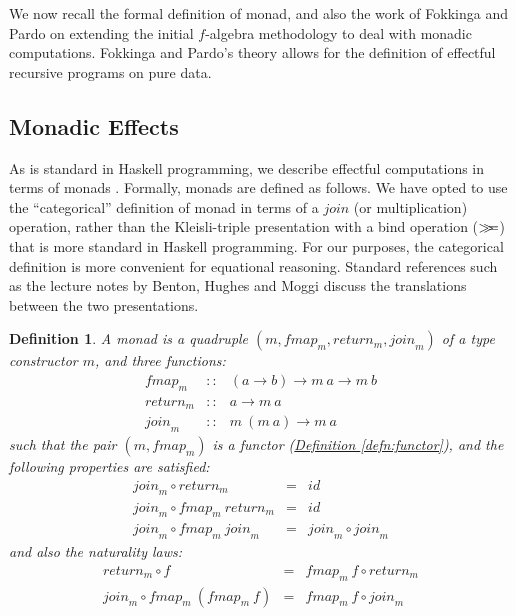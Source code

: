 \documentclass{jfp1}
\newcommand{\mbind}{\mathrel{>\kern-0.45em>\kern-0.45em=}}
\newtheorem{definition}{Definition}
\newcommand{\defref}[1]{\hyperref[#1]{Definition \ref*{#1}}}
\begin{document}
We now recall the formal definition of monad, and also the work of
Fokkinga and Pardo on extending the initial $f$-algebra methodology to
deal with monadic computations. Fokkinga and Pardo's theory allows for
the definition of effectful recursive programs on pure data.

\subsection{Monadic Effects}

As is standard in Haskell programming, we describe effectful
computations in terms of monads \cite{moggi91notions,
  peytonjones93imperative}. Formally, monads are defined as follows.
We have opted to use the ``categorical'' definition of monad in terms
of a $\mathit{join}$ (or multiplication) operation, rather than the
Kleisli-triple presentation with a bind operation ($\mbind$) that is
more standard in Haskell programming. For our purposes, the
categorical definition is more convenient for equational
reasoning. Standard references such as the lecture notes by Benton,
Hughes and Moggi \cite{benton00monads} discuss the translations
between the two presentations.

\begin{definition}\label{defn:monad}
  A monad is a quadruple $(m, \mathit{fmap}_m, \mathit{return}_m,
  \mathit{join}_m)$ of a type constructor $m$, and three functions:
  \begin{displaymath}
    \begin{array}{rcl}
      \mathit{fmap}_m   & :: & (a \to b) \to m~a \to m~b \\
      \mathit{return}_m & :: & a \to m~a \\
      \mathit{join}_m   & :: & m~(m~a) \to m~a
    \end{array}
  \end{displaymath}
  such that the pair $(m, \mathit{fmap}_m)$ is a functor
  (\defref{defn:functor}), and the following properties are satisfied:
  \begin{eqnarray}
    \label{eq:monad-join-return}
    \mathit{join}_m \circ \mathit{return}_m & = & \mathit{id} \\
    \label{eq:monad-join-fmap-return}
    \mathit{join}_m \circ \mathit{fmap}_m~\mathit{return}_m & = & \mathit{id} \\
    \label{eq:monad-join-join}
    \mathit{join}_m \circ \mathit{fmap}_m~\mathit{join}_m & = & \mathit{join}_m \circ \mathit{join}_m
  \end{eqnarray}
  and also the naturality laws:
  \begin{eqnarray}
    \label{eq:monad-return-natural}
    \mathit{return}_m \circ f & = & \mathit{fmap}_m~f \circ \mathit{return}_m \\
    \label{eq:monad-join-natural}
    \mathit{join}_m \circ \mathit{fmap}_m~(\mathit{fmap}_m~f) & = & \mathit{fmap}_m~f \circ \mathit{join}_m
  \end{eqnarray}
\end{definition}
\end{document}

